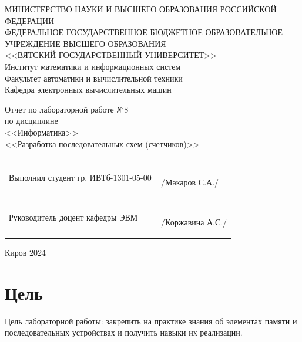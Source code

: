 \documentclass[a4paper,14pt]{extarticle}
\begin{document}
	
	\newpage\thispagestyle{empty}
	\begin{center}
		\MakeUppercase{
			Министерство науки и высшего образования Российской Федерации\\
			Федеральное государственное бюджетное образовательное учреждение высшего образования\\
			<<Вятский Государственный Университет>>\\
		}
		Институт математики и информационных систем\\
		Факультет автоматики и вычислительной техники\\
		Кафедра электронных вычислительных машин
	\end{center}
	\vfill
	
	\begin{center}
		Отчет по лабораторной работе №8\\
		по дисциплине\\
		<<Информатика>>\\
		<<Разработка последовательных схем (счетчиков)>>
	\end{center}
	\vfill
	
	\noindent
	\begin{tabular}{ll}
		Выполнил студент гр. ИВТб-1301-05-00 \hspace{5mm} &
		\rule[-1mm]{25mm}{0.10mm}\,/Макаров С.А./\\
		
		Руководитель доцент кафедры ЭВМ & \rule[-1mm]{25mm}{0.10mm}\,/Коржавина А.С./\\
	\end{tabular}
	
	\vfill
	\begin{center}
		Киров 2024
	\end{center}
	
	\newpage
	\section*{Цель}
	Цель лабораторной работы: закрепить на практике знания об элементах памяти и последовательных устройствах и получить навыки их реализации.
	
\end{document}
